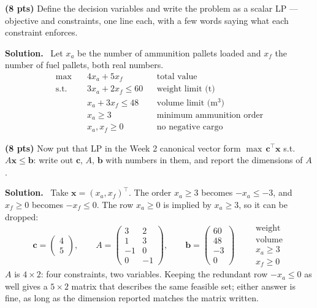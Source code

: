 \documentclass[10pt]{article}
\newenvironment{solution}
  {\par\smallskip\begingroup\color{solink}\textbf{Solution.}\ }
  {\endgroup\par}
\begin{document}
\begin{parts}
\item \textbf{(8 pts)} Define the decision variables and write the problem as a scalar
  LP --- objective and constraints, one line each, with a few words saying what each
  constraint enforces.

\begin{solution}
Let $x_a$ be the number of ammunition pallets loaded and $x_f$ the number of fuel
pallets, both real numbers.
\[
\begin{aligned}
  \max\quad & 4x_a + 5x_f && \text{total value} \\
  \text{s.t.}\quad & 3x_a + 2x_f \le 60 && \text{weight limit (t)} \\
                   & x_a + 3x_f \le 48 && \text{volume limit (m$^3$)} \\
                   & x_a \ge 3 && \text{minimum ammunition order} \\
                   & x_a, x_f \ge 0 && \text{no negative cargo}
\end{aligned}
\]
\end{solution}

\item \textbf{(8 pts)} Now put that LP in the Week 2 canonical vector form
  $\max\, \bm{c}^{\top}\bm{x}$ s.t.\ $A\bm{x} \le \bm{b}$: write out $\bm{c}$, $A$, $\bm{b}$ with numbers in them, and
  report the dimensions of $A$.

\begin{solution}
Take $\bm{x} = (x_a, x_f)^{\top}$. The order $x_a \ge 3$ becomes $-x_a \le -3$, and
$x_f \ge 0$ becomes $-x_f \le 0$. The row $x_a \ge 0$ is implied by $x_a \ge 3$, so it
can be dropped:
\[
\bm{c} = \begin{pmatrix} 4 \\ 5 \end{pmatrix}, \qquad
A = \begin{pmatrix}
  3 & 2 \\
  1 & 3 \\
  -1 & 0 \\
  0 & -1
\end{pmatrix}, \qquad
\bm{b} = \begin{pmatrix} 60 \\ 48 \\ -3 \\ 0 \end{pmatrix}
\qquad
\begin{array}{l}
  \scriptstyle\text{weight} \\ \scriptstyle\text{volume} \\
  \scriptstyle x_a \ge 3 \\ \scriptstyle x_f \ge 0
\end{array}
\]
$A$ is $4 \times 2$: four constraints, two variables. Keeping the redundant row
$-x_a \le 0$ as well gives a $5 \times 2$ matrix that describes the same feasible set;
either answer is fine, as long as the dimension reported matches the matrix written.
\end{solution}


\end{parts}
\end{document}
